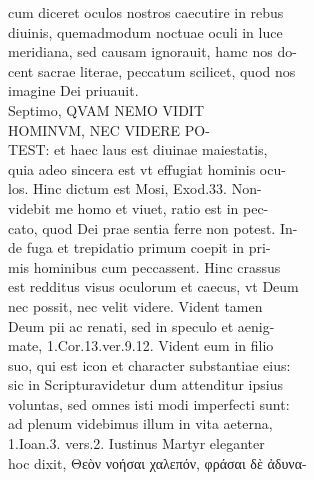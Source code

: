 \documentclass{article}
\begin{document}
\begin{pages}
                cum diceret oculos nostros caecutire in rebus \\
                diuinis, quemadmodum noctuae oculi in luce \\
                meridiana, sed causam ignorauit, hamc nos do- \\
                cent sacrae literae, peccatum scilicet, quod nos \\
                imagine Dei priuauit. \\
                Septimo, QVAM NEMO VIDIT \\
                HOMINVM, NEC VIDERE PO- \\
                TEST: et haec laus est diuinae maiestatis, \\
                quia adeo sincera est vt effugiat hominis ocu- \\
                los. Hinc dictum est Mosi, Exod.33. Non- \\
                videbit me homo et viuet, ratio est in pec- \\
                cato, quod Dei prae sentia ferre non potest. In- \\
                de fuga et trepidatio primum coepit in pri- \\
                mis hominibus cum peccassent. Hinc crassus \\
                est redditus visus oculorum et caecus, vt Deum \\
                nec possit, nec velit videre. Vident tamen \\
                Deum pii ac renati, sed in speculo et aenig- \\
                mate, 1.Cor.13.ver.9.12. Vident eum in filio \\
                suo, qui est icon et character substantiae eius: \\
                sic in Scripturavidetur dum attenditur ipsius \\
                voluntas, sed omnes isti modi imperfecti sunt: \\
                ad plenum videbimus illum in vita aeterna, \\
                1.Ioan.3. vers.2. Iustinus Martyr eleganter \\
                hoc dixit, Θεὸν νοήσαι χαλεπόν, φράσαι δὲ ἀδυνα- \\

\end{pages}
\end{document}
